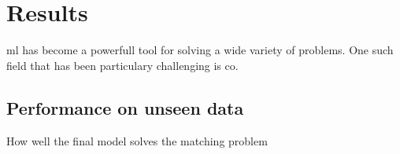 \chapter{Results}

\gls{ml} has become a powerfull tool for solving a wide variety of problems. One such field that has been particulary challenging is \gls{co}. 

\section{Performance on unseen data}

How well the final model solves the matching problem